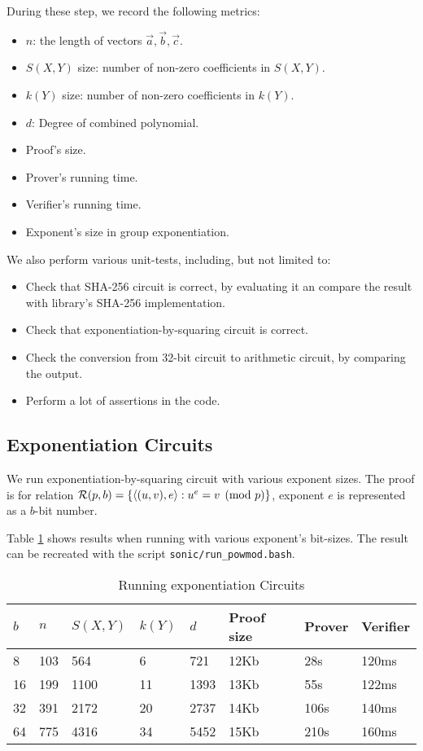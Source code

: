 During these step, we record the following metrics:
\begin{itemize}
    \item $n$: the length of vectors $\Vec{a}, \Vec{b}, \Vec{c}$.
    \item $S(X, Y)$ size: number of non-zero coefficients in $S(X, Y)$.
    \item $k(Y)$ size: number of non-zero coefficients in $k(Y)$.
    \item $d$: Degree of combined polynomial.
    \item Proof's size.
    \item Prover's running time.
    \item Verifier's running time.
    \item Exponent's size in group exponentiation. 
\end{itemize}

We also perform various unit-tests, including, but not limited to:
\begin{itemize}
    \item Check that SHA-256 circuit is correct, by evaluating it an compare the result with library's SHA-256 implementation.
    \item Check that exponentiation-by-squaring circuit is correct.
    \item Check the conversion from 32-bit circuit to arithmetic circuit, by comparing the output.
    \item Perform a lot of assertions in the code.
\end{itemize}

\subsection{Exponentiation Circuits}

We run exponentiation-by-squaring circuit with various exponent sizes. The proof is for relation $\mathcal{R}(p, b) = \{\langle (u, v), e \rangle : u^e = v \pmod p \}$, exponent $e$ is represented as a $b$-bit number.

Table \ref{tab:powmod-result} shows results when running with various exponent's bit-sizes. The result can be recreated with the script \texttt{sonic/run\_powmod.bash}.

\begin{table}[!htp]
\centering
\begin{tabular}{|l|l|l|l|l|l|l|l|}
\hline
$b$ & $n$ & $S(X, Y)$ & $k(Y)$ & $d$  & Proof size & Prover & Verifier \\ \hline
8   & 103 & 564       & 6      & 721  & 12Kb       & 28s    & 120ms    \\ \hline
16  & 199 & 1100      & 11     & 1393 & 13Kb       & 55s    & 122ms    \\ \hline
32  & 391 & 2172      & 20     & 2737 & 14Kb       & 106s   & 140ms    \\ \hline
64  & 775 & 4316      & 34     & 5452 & 15Kb       & 210s   & 160ms    \\ \hline
\end{tabular}
\caption{Running exponentiation Circuits}
\label{tab:powmod-result}
\end{table}

